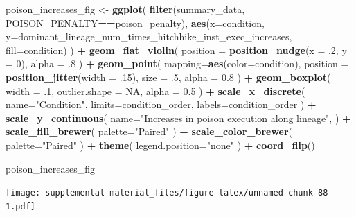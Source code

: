 \documentclass[]{book}
\newenvironment{Shaded}{\begin{snugshade}}{\end{snugshade}}
\newcommand{\DataTypeTok}[1]{\textcolor[rgb]{0.13,0.29,0.53}{#1}}
\newcommand{\DecValTok}[1]{\textcolor[rgb]{0.00,0.00,0.81}{#1}}
\newcommand{\FloatTok}[1]{\textcolor[rgb]{0.00,0.00,0.81}{#1}}
\newcommand{\KeywordTok}[1]{\textcolor[rgb]{0.13,0.29,0.53}{\textbf{#1}}}
\newcommand{\NormalTok}[1]{#1}
\newcommand{\OperatorTok}[1]{\textcolor[rgb]{0.81,0.36,0.00}{\textbf{#1}}}
\newcommand{\OtherTok}[1]{\textcolor[rgb]{0.56,0.35,0.01}{#1}}
\newcommand{\StringTok}[1]{\textcolor[rgb]{0.31,0.60,0.02}{#1}}
\begin{document}
\begin{Shaded}
\begin{Highlighting}[]
\NormalTok{poison_increases_fig <-}\StringTok{ }\KeywordTok{ggplot}\NormalTok{(}
    \KeywordTok{filter}\NormalTok{(summary_data, POISON_PENALTY}\OperatorTok{==}\NormalTok{poison_penalty),}
    \KeywordTok{aes}\NormalTok{(}\DataTypeTok{x=}\NormalTok{condition, }\DataTypeTok{y=}\NormalTok{dominant_lineage_num_times_hitchhike_inst_exec_increases, }\DataTypeTok{fill=}\NormalTok{condition)}
\NormalTok{  ) }\OperatorTok{+}
\StringTok{  }\KeywordTok{geom_flat_violin}\NormalTok{(}
    \DataTypeTok{position =} \KeywordTok{position_nudge}\NormalTok{(}\DataTypeTok{x =} \FloatTok{.2}\NormalTok{, }\DataTypeTok{y =} \DecValTok{0}\NormalTok{),}
    \DataTypeTok{alpha =} \FloatTok{.8}
\NormalTok{  ) }\OperatorTok{+}
\StringTok{  }\KeywordTok{geom_point}\NormalTok{(}
    \DataTypeTok{mapping=}\KeywordTok{aes}\NormalTok{(}\DataTypeTok{color=}\NormalTok{condition),}
    \DataTypeTok{position =} \KeywordTok{position_jitter}\NormalTok{(}\DataTypeTok{width =} \FloatTok{.15}\NormalTok{),}
    \DataTypeTok{size =} \FloatTok{.5}\NormalTok{,}
    \DataTypeTok{alpha =} \FloatTok{0.8}
\NormalTok{  ) }\OperatorTok{+}
\StringTok{  }\KeywordTok{geom_boxplot}\NormalTok{(}
    \DataTypeTok{width =} \FloatTok{.1}\NormalTok{,}
    \DataTypeTok{outlier.shape =} \OtherTok{NA}\NormalTok{,}
    \DataTypeTok{alpha =} \FloatTok{0.5}
\NormalTok{  ) }\OperatorTok{+}
\StringTok{  }\KeywordTok{scale_x_discrete}\NormalTok{(}
    \DataTypeTok{name=}\StringTok{"Condition"}\NormalTok{,}
    \DataTypeTok{limits=}\NormalTok{condition_order,}
    \DataTypeTok{labels=}\NormalTok{condition_order}
\NormalTok{  ) }\OperatorTok{+}
\StringTok{  }\KeywordTok{scale_y_continuous}\NormalTok{(}
    \DataTypeTok{name=}\StringTok{"Increases in poison execution along lineage"}\NormalTok{,}
\NormalTok{  ) }\OperatorTok{+}
\StringTok{  }\KeywordTok{scale_fill_brewer}\NormalTok{(}
    \DataTypeTok{palette=}\StringTok{"Paired"}
\NormalTok{  ) }\OperatorTok{+}
\StringTok{  }\KeywordTok{scale_color_brewer}\NormalTok{(}
    \DataTypeTok{palette=}\StringTok{"Paired"}
\NormalTok{  ) }\OperatorTok{+}
\StringTok{  }\KeywordTok{theme}\NormalTok{(}
    \DataTypeTok{legend.position=}\StringTok{"none"}
\NormalTok{  ) }\OperatorTok{+}
\StringTok{  }\KeywordTok{coord_flip}\NormalTok{()}

\NormalTok{poison_increases_fig}
\end{Highlighting}
\end{Shaded}

\texttt{[image: supplemental-material\_files/figure-latex/unnamed-chunk-88-1.pdf]}
\end{document}
